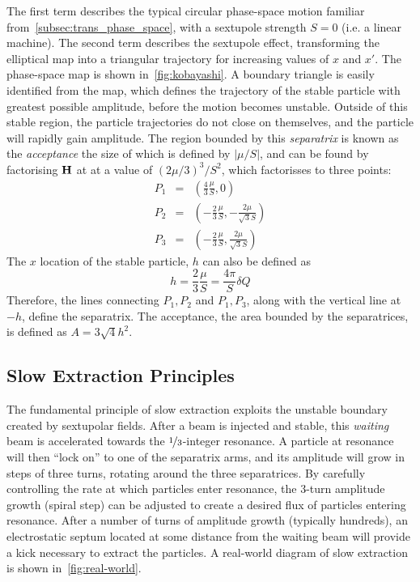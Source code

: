 \documentclass[11pt]{report}
\begin{document}
The first term describes the typical circular phase-space motion familiar from~\autoref{subsec:trans_phase_space}, with a sextupole strength $S=0$ (i.e. a linear machine). The second term describes the sextupole effect, transforming the elliptical map into a triangular trajectory for increasing values of $x$ and $x'$. The phase-space map is shown in~\autoref{fig:kobayashi}. A boundary triangle is easily identified from the map, which defines the trajectory of the stable particle with greatest possible amplitude, before the motion becomes unstable. Outside of this stable region, the particle trajectories do not close on themselves, and the particle will rapidly gain amplitude. The region bounded by this \textit{separatrix} is known as the \textit{acceptance} the size of which is defined by $|\mu /S|$, and can be found by factorising $\bf H$ at at a value of $(2\mu /3)^3/S^2$, which factorisses to three points:
\begin{eqnarray}
  P_1 &=& \left(\frac 43 \frac\mu S,    0                       \right) \\
  P_2 &=& \left(-\frac 23 \frac \mu S,  -\frac{2\mu}{\sqrt 3 S} \right) \\
  P_3 &=& \left(-\frac 23 \frac \mu S,  \frac{2\mu}{\sqrt 3 S} \right)
\end{eqnarray}
The $x$ location of the stable particle, $h$ can also be defined as
\begin{equation}
  h=\frac 23 \frac \mu S = \frac{4\pi}S\delta Q
  \label{eq:apothem}
\end{equation}
Therefore, the lines connecting $P_1, P_2$ and $P_1, P_3$, along with the vertical line at $-h$, define the separatrix. The acceptance, the area bounded by the separatrices, is defined as $A=3\sqrt 4 h^2$.

\subsection{Slow Extraction Principles}
The fundamental principle of slow extraction exploits the unstable boundary created by sextupolar fields. After a beam is injected and stable, this \textit{waiting} beam is accelerated towards the $\nicefrac 13$-integer resonance. A particle at resonance will then ``lock on'' to one of the separatrix arms, and its amplitude will grow in steps of three turns, rotating around the three separatrices. By carefully controlling the rate at which particles enter resonance, the 3-turn amplitude growth (spiral step) can be adjusted to create a desired flux of particles entering resonance. After a number of turns of amplitude growth (typically hundreds), an electrostatic septum located at some distance from the waiting beam will provide a kick necessary to extract the particles. A real-world diagram of slow extraction is shown in~\autoref{fig:real-world}.
\end{document}
